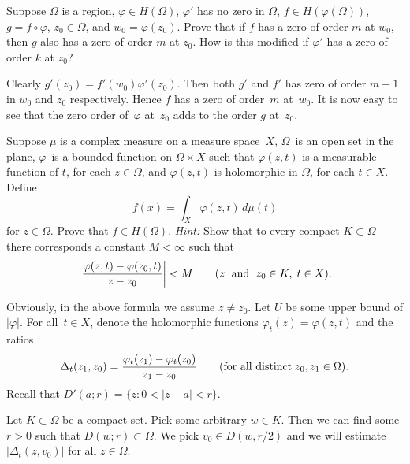 \begin{enumerate}
\begin{excopy}
Suppose \(\Omega\) is a region, \(\varphi \in H(\Omega)\),
\(\varphi'\) has no zero in \(\Omega\),
\(f\in H(\varphi(\Omega))\),
\(g = f\circ \varphi\), \(z_0\in\Omega\), and
\(w_0 = \varphi(z_0)\).
Prove that if $f$ has a zero of order $m$ at \(w_0\),
then $g$ also has a zero of order $m$ at \(z_0\).
How is this modified if \(\varphi'\) has a zero of order $k$ at \(z_0\)?
\end{excopy}

Clearly \(g'(z_0) = f'(w_0)\varphi'(z_0)\).
Then  both \(g'\) and \(f'\) 
has zero of order \(m-1\) in \(w_0\) and \(z_0\) respectively.
Hence  $f$ has a zero of order~$m$ at~\(w_0\).
It is now easy to see that the zero order of~\(\varphi\) at~\(z_0\)
adds to the order $g$ at~\(z_0\).

\begin{excopy}
Suppose \(\mu\) is a complex measure on a measure space~$X$,
\(\Omega\)~is an open set in the plane,
\(\varphi\)~is a bounded function on \(\Omega\times X\)
such that \(\varphi(z,t)\) is a measurable function of $t$,
for each \(z \in \Omega\), and \(\varphi(z,t)\) is holomorphic in \(\Omega\),
for each \(t\in X\). Define
\begin{equation*}
f(x) = \int_X \varphi(z,t)\,d\mu(t)
\end{equation*}
for \(z\in\Omega\). Prove that \(f\in H(\Omega)\).
\emph{Hint:} Show that to every compact \(K \subset \Omega\) there corresponds
a constant \(M<\infty\) such that
\begin{equation*}
\left| \frac{\varphi(z,t) - \varphi(z_0,t)}{z - z_0}\right| < M
\qquad (z \;\textnormal{ and }\; z_0\in K,\; t\in X).
\end{equation*}
\end{excopy}

Obviously, in the above formula we assume \(z\neq z_0\).
Let $U$ be some upper bound of \(|\varphi|\).
For all~\(t\in X\),
denote the holomorphic functions \(\varphi_t(z) = \varphi(z,t)\)
and the ratios
\begin{equation*}
\Delta_t(z_1,z_0) = \frac{\varphi_t(z_1) - \varphi_t(z_0)}{z_1 - z_0}
\qquad (\textnormal{for all distinct}\; z_0,z_1\in\Omega).
\end{equation*}
Recall that \(D'(a;r) = \{z: 0 < |z-a|<r\}\).

Let \(K\subset \Omega\) be a compact set.
Pick some arbitrary \(w\in K\).
Then we can find some \(r>0\) such that \(\overline{D(w;r)}\subset \Omega\).
We pick \(v_0\in D(w,r/2)\) and
we will estimate \(|\Delta_t(z,v_0)|\) for all \(z\in\Omega\). 


\end{enumerate}
